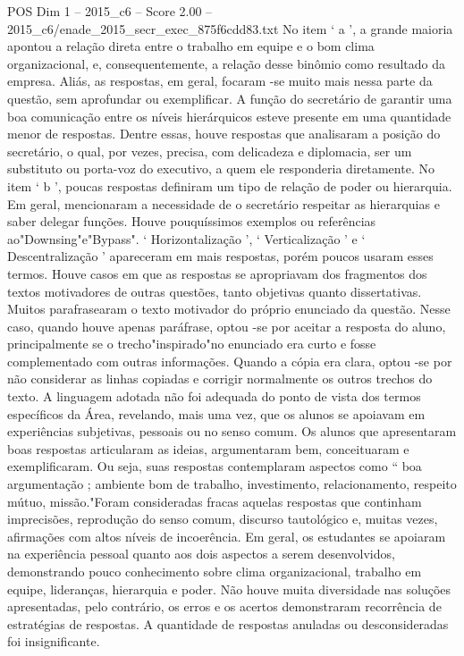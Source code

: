 \begin{textsample}{POS Dim 1 – 2015\_c6 – Score 2.00 – 2015\_c6/enade\_2015\_secr\_exec\_875f6cdd83.txt}
No item ‘ a ’, a grande maioria apontou a relação direta entre o trabalho em equipe e o bom clima organizacional, e, consequentemente, a relação desse binômio como resultado da empresa.
Aliás, as respostas, em geral, focaram -se muito mais nessa parte da questão, sem aprofundar ou exemplificar.
A função do secretário de garantir uma boa comunicação entre os níveis hierárquicos esteve presente em uma quantidade menor de respostas.
Dentre essas, houve respostas que analisaram a posição do secretário, o qual, por vezes, precisa, com delicadeza e diplomacia, ser um substituto ou porta-voz do executivo, a quem ele responderia diretamente.
No item ‘ b ’, poucas respostas definiram um tipo de relação de poder ou hierarquia.
Em geral, mencionaram a necessidade de o secretário respeitar as hierarquias e saber delegar funções.
Houve pouquíssimos exemplos ou referências ao"Downsing"e"Bypass". ‘ Horizontalização ’, ‘ Verticalização ’ e ‘ Descentralização ’ apareceram em mais respostas, porém poucos usaram esses termos.
Houve casos em que as respostas se apropriavam dos fragmentos dos textos motivadores de outras questões, tanto objetivas quanto dissertativas.
Muitos parafrasearam o texto motivador do próprio enunciado da questão.
Nesse caso, quando houve apenas paráfrase, optou -se por aceitar a resposta do aluno, principalmente se o trecho"inspirado"no enunciado era curto e fosse complementado com outras informações.
Quando a cópia era clara, optou -se por não considerar as linhas copiadas e corrigir normalmente os outros trechos do texto.
A linguagem adotada não foi adequada do ponto de vista dos termos específicos da Área, revelando, mais uma vez, que os alunos se apoiavam em experiências subjetivas, pessoais ou no senso comum.
Os alunos que apresentaram boas respostas articularam as ideias, argumentaram bem, conceituaram e exemplificaram.
Ou seja, suas respostas contemplaram aspectos como “ boa argumentação ; ambiente bom de trabalho, investimento, relacionamento, respeito mútuo, missão."Foram consideradas fracas aquelas respostas que continham imprecisões, reprodução do senso comum, discurso tautológico e, muitas vezes, afirmações com altos níveis de incoerência.
Em geral, os estudantes se apoiaram na experiência pessoal quanto aos dois aspectos a serem desenvolvidos, demonstrando pouco conhecimento sobre clima organizacional, trabalho em equipe, lideranças, hierarquia e poder.
Não houve muita diversidade nas soluções apresentadas, pelo contrário, os erros e os acertos demonstraram recorrência de estratégias de respostas.
A quantidade de respostas anuladas ou desconsideradas foi insignificante.

\end{textsample}

